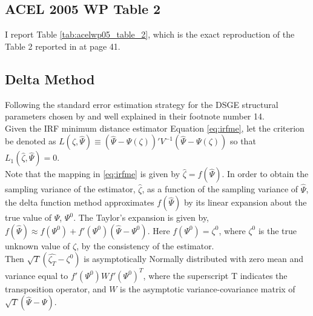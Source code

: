 \documentclass[12pt, a4paper]{article}
\begin{document}
\begin{appendices}
\clearpage

\subsection{ACEL 2005 WP Table 2}
\label{app:acelwp05_table_2}

I report Table \ref{tab:acelwp05_table_2}, which is the exact reproduction of the 
Table 2 reported in \citet{ACEL2005WP} at page 41.

    {}
    {\noindent{}}
    \label{tab:acelwp05_table_2}
\FloatBarrier

\clearpage

\subsection{Delta Method}
\label{app:delta_method}
Following the standard error estimation strategy for the DSGE structural parameters chosen by \citet{ACEL2005WP}
and well explained in their footnote number 14.
\\

Given the IRF minimum distance estimator Equation \ref{eq:irfme}, 
let the criterion be denoted as $L(\zeta,\hat{\Psi}) \equiv (\hat{\Psi} - \Psi(\zeta))' V^{-1} (\hat{\Psi} - \Psi(\zeta))$ 
so that $L_1(\hat{\zeta},\hat{\Psi}) = 0$.
\\

Note that the mapping in \ref{eq:irfme} is given by $\hat{\zeta} = f(\hat{\Psi})$. In order to obtain 
the sampling variance of the estimator, $\hat{\zeta}$, as a function of the sampling variance of $\hat{\Psi}$, 
the delta function method approximates $f(\hat{\Psi})$ by its linear expansion about the true value of $\Psi$, $\Psi^0$.
The Taylor's expansion is given by, $f(\hat{\Psi}) \approx f(\Psi^0) + f'(\Psi^0)(\hat{\Psi} - \Psi^0)$.
Here $f(\Psi^0) = \zeta^0$, where $\zeta^0$ is the true unknown value of $\zeta$, by the consistency of the estimator.
\\

Then $\sqrt{T}(\hat{\zeta_T}-\zeta^0)$ is asymptotically Normally distributed with zero mean and variance equal to 
$f'(\Psi^0)Wf'(\Psi^0)^{T}$, where the superscript T indicates the transposition operator, 
and $W$ is the asymptotic variance-covariance matrix of $\sqrt{T}(\hat{\Psi}-\Psi)$.
\\


\end{appendices}
\end{document}
